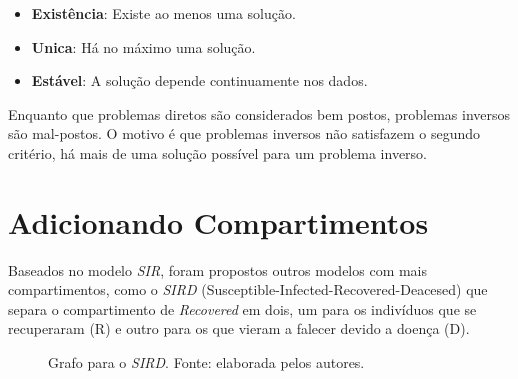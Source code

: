 \begin{itemize}
    \item \textbf{Existência}: Existe ao menos uma solução. 
    \item \textbf{Unica}: Há no máximo uma solução.
    \item \textbf{Estável}: A solução depende continuamente nos dados.  
\end{itemize}

Enquanto que problemas diretos são considerados bem postos, problemas inversos 
são mal-postos. O motivo é que problemas inversos não satisfazem o segundo critério,
há mais de uma solução possível para um problema inverso.

\section{Adicionando Compartimentos}

Baseados no modelo \textit{SIR}, foram propostos outros modelos com mais 
compartimentos, como o \textit{SIRD} (Susceptible-Infected-Recovered-Deacesed) 
\cite{giles:77-sird} que separa o compartimento de \textit{Recovered} em dois, um
para os indivíduos que se recuperaram (R) e outro para os que vieram a falecer devido
a doença (D).

\begin{figure}
\centering
{}
\caption{Grafo para o \textit{SIRD}. Fonte: elaborada pelos autores.}
\label{fig:sird-grafo}
\end{figure}

